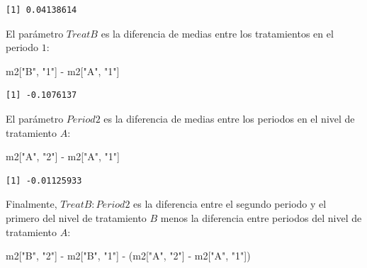 \documentclass[
  12pt,
  a4paper,
  extrafontsizes,
  onecolumn,
  openright,
  table]{memoir}
\newenvironment{Shaded}{\begin{snugshade}}{\end{snugshade}}
\newcommand{\NormalTok}[1]{\textcolor[rgb]{0.00,0.23,0.31}{#1}}
\newcommand{\SpecialCharTok}[1]{\textcolor[rgb]{0.37,0.37,0.37}{#1}}
\newcommand{\StringTok}[1]{\textcolor[rgb]{0.13,0.47,0.30}{#1}}
\begin{document}
\begin{verbatim}
[1] 0.04138614
\end{verbatim}

\normalsize

El parámetro \(TreatB\) es la diferencia de medias entre los
tratamientos en el periodo \(1\):

\scriptsize

\begin{Shaded}
\begin{Highlighting}[]
\NormalTok{m2[}\StringTok{"B"}\NormalTok{, }\StringTok{"1"}\NormalTok{] }\SpecialCharTok{{-}}\NormalTok{ m2[}\StringTok{"A"}\NormalTok{, }\StringTok{"1"}\NormalTok{]}
\end{Highlighting}
\end{Shaded}

\begin{verbatim}
[1] -0.1076137
\end{verbatim}

\normalsize

El parámetro \(Period2\) es la diferencia de medias entre los periodos
en el nivel de tratamiento \(A\):

\scriptsize

\begin{Shaded}
\begin{Highlighting}[]
\NormalTok{m2[}\StringTok{"A"}\NormalTok{, }\StringTok{"2"}\NormalTok{] }\SpecialCharTok{{-}}\NormalTok{ m2[}\StringTok{"A"}\NormalTok{, }\StringTok{"1"}\NormalTok{]}
\end{Highlighting}
\end{Shaded}

\begin{verbatim}
[1] -0.01125933
\end{verbatim}

\normalsize

Finalmente, \(TreatB:Period2\) es la diferencia entre el segundo periodo
y el primero del nivel de tratamiento \(B\) menos la diferencia entre
periodos del nivel de tratamiento \(A\):

\scriptsize

\begin{Shaded}
\begin{Highlighting}[]
\NormalTok{m2[}\StringTok{"B"}\NormalTok{, }\StringTok{"2"}\NormalTok{] }\SpecialCharTok{{-}}\NormalTok{ m2[}\StringTok{"B"}\NormalTok{, }\StringTok{"1"}\NormalTok{] }\SpecialCharTok{{-}}\NormalTok{ (m2[}\StringTok{"A"}\NormalTok{, }\StringTok{"2"}\NormalTok{] }\SpecialCharTok{{-}}\NormalTok{ m2[}\StringTok{"A"}\NormalTok{, }\StringTok{"1"}\NormalTok{])}
\end{Highlighting}
\end{Shaded}
\end{document}
